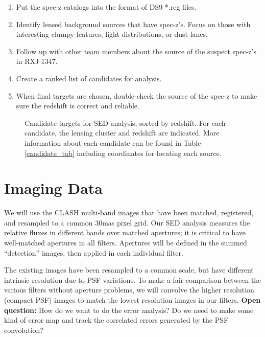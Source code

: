\documentclass{emulateapj}
\begin{document}
\vspace{-0.1in}
\begin{enumerate}\itemsep-6pt
\item{Put the spec-z catalogs into the format of DS9 *.reg files.}
\item{Identify lensed background sources that have spec-z's.  Focus on
those with interesting clumpy features, light distributions, or dust
lanes.} 
\item{Follow up with other team members about the source of the
  suspect spec-z's in RXJ 1347.}
\item{Create a ranked list of candidates for analysis.}
\item{When final targets are chosen, double-check the source of the
  spec-z to make sure the redshift is correct and reliable.}
\end{enumerate}


\begin{figure}[!t]
\caption{Candidate targets for SED analysis, sorted by redshift.  For
  each candidate, the lensing cluster and redshift are indicated.
  More information about each candidate can be found in Table
  \ref{candidate_tab} including coordinates for locating each source.}
\label{candidate_fig}
\end{figure}



\section{Imaging Data}\label{imaging}

We will use the CLASH multi-band images that have been matched,
registered, and resampled to a common 30mas pixel grid.  Our SED
analysis measures the relative fluxes in different bands over matched
apertures; it is critical to have well-matched apertures in all
filters.  Apertures will be defined in the summed ``detection''
images, then applied in each individual filter.

The existing images have been resampled to a common scale, but have
different intrinsic resolution due to PSF variations.  To make a fair
comparison between the various filters without aperture problems, we
will convolve the higher resolution (compact PSF) images to match the
lowest resolution images in our filters.  {\bf{Open question:}} How do
we want to do the error analysis?  Do we need to make some kind of
error map and track the correlated errors generated by the PSF
convolution?
\end{document}
